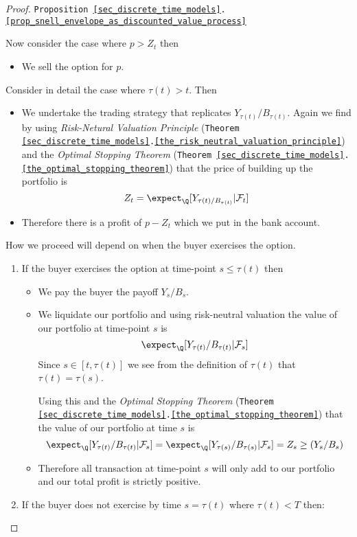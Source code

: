 \documentclass[11pt,a4paper]{article}
\begin{document}
\begin{proof}{\texttt{Proposition \ref{sec_discrete_time_models}.\ref{prop_snell_envelope_as_discounted_value_process}}}
    \par Now consider the case where $p>Z_t$ then
    \begin{itemize}
      \item We sell the option for $p$.
    \end{itemize}
    Consider in detail the case where $\tau(t)>t$. Then
    \begin{itemize}
      \item We undertake the trading strategy that replicates $Y_{\tau(t)}/B_{\tau(t)}$. Again we find by using \textit{Risk-Netural Valuation Principle} (\texttt{Theorem \ref{sec_discrete_time_models}.\ref{the_risk_neutral_valuation_principle}}) and the \textit{Optimal Stopping Theorem} (\texttt{Theorem \ref{sec_discrete_time_models}.\ref{the_optimal_stopping_theorem}}) that the price of building up the portfolio is
      \[ Z_t=\expect_\Q[Y_{\tau(t)/B_{\tau(t)}}|\mathcal{F}_t] \]
      \item Therefore there is a profit of $p-Z_t$ which we put in the bank account.
    \end{itemize}
    How we proceed will depend on when the buyer exercises the option.
    \begin{enumerate}
      \item If the buyer exercises the option at time-point $s\leq\tau(t)$ then
      \begin{itemize}
        \item We pay the buyer the payoff $Y_s/B_s$.
        \item We liquidate our portfolio and using risk-neutral valuation the value of our portfolio at time-point $s$ is
        \[ \expect_\Q[Y_{\tau(t)}/B_{\tau(t)}|\mathcal{F}_s] \]
        Since $s\in[t,\tau(t)]$ we see from the definition of $\tau(t)$ that $\tau(t)=\tau(s)$.
        \par Using this and the \textit{Optimal Stopping Theorem} (\texttt{Theorem \ref{sec_discrete_time_models}.\ref{the_optimal_stopping_theorem}}) that the value of our portfolio at time $s$ is
        \[ \expect_\Q[Y_{\tau(t)}/B_{\tau(t)}|\mathcal{F}_s]=\expect_\Q[Y_{\tau(s)}/B_{\tau(s)}|\mathcal{F}_s]=Z_s\geq (Y_s/B_s) \]
        \item Therefore all transaction at time-point $s$ will only add to our portfolio and our total profit is strictly positive.
      \end{itemize}
      \item If the buyer does not exercise by time $s=\tau(t)$ where $\tau(t)<T$ then:
      \begin{itemize}

\end{itemize}
\end{enumerate}
\end{proof}
\end{document}
